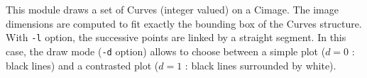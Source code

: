 This module draws a set of Curves (integer valued) on a Cimage.
The image dimensions are computed to fit exactly the bounding box
of the Curves structure.
With \verb+-l+ option, the successive points are linked by a straight 
segment. In this case, the draw mode (\verb+-d+ option) allows 
to choose between a simple plot ($d=0$ : black lines) and a 
contrasted plot ($d=1$ : black lines surrounded by white).
